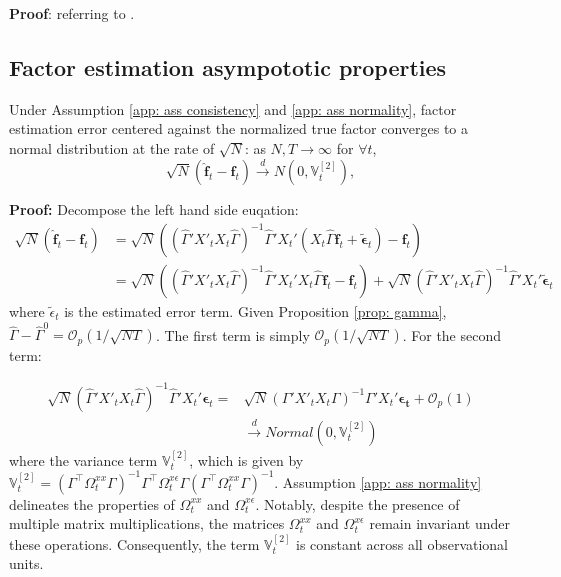 \documentclass[12pt]{article}
\begin{document}
\textbf{Proof}: referring to \cite{kelly2020instrumented}.
\subsection{Factor estimation asympototic properties}
\begin{proposition}
\label{prop: factor}
Under Assumption \ref{app: ass consistency} and \ref{app: ass normality}, factor estimation error centered against the normalized true factor converges to a normal distribution at the rate of $\sqrt{N}$: as $N, T \to \infty$ for $\forall t$,
$$
\sqrt{N}\left(\hat{\mathbf{f}}_t - \mathbf{f}_t\right) \xrightarrow{d} N\left(0, \mathbb{V}_t^{[2]}\right),
$$
\end{proposition}

\textbf{Proof:} Decompose the left hand side euqation:
\begin{equation*}
\begin{aligned}
\sqrt{N}\left(\mathbf{\hat{f}}_t - \mathbf{f}_t\right) &= \sqrt{N}\left(\left( \hat{\Gamma}'X'_tX_t\hat{\Gamma} \right)^{-1}\hat{\Gamma}'X_t' \left(X_t\hat{\Gamma}\mathbf{f}_t+ \mathbf{\tilde{\epsilon}}_t \right) - \mathbf{f}_t\right)\\
&= \sqrt{N}\left(\left( \hat{\Gamma}'X'_tX_t\hat{\Gamma} \right)^{-1}\hat{\Gamma}'X_t'X_t \hat{\Gamma}\mathbf{f}_t - \mathbf{f}_t\right) + \sqrt{N}\left( \hat{\Gamma}'X'_tX_t\hat{\Gamma} \right)^{-1}\hat{\Gamma}'X_t'\mathbf{\tilde{\epsilon}}_t
\end{aligned}
\end{equation*}
where $\tilde{\epsilon}_t$ is the estimated error term. Given Proposition \ref{prop: gamma}, $\hat{\Gamma} - \hat{\Gamma}^0 = \mathcal{O}_p \left( 1/\sqrt{NT} \right)$. The first term is simply $\mathcal{O}_p\left(1/\sqrt{NT}\right)$. For the second term:

\begin{equation*}
\begin{aligned}
\sqrt{N}\left( \hat{\Gamma}'X'_tX_t\hat{\Gamma} \right)^{-1}\hat{\Gamma}'X_t'\mathbf{\epsilon}_t = &\sqrt{N}\left( \Gamma'X'_tX_t\Gamma \right)^{-1}\Gamma'X_t'\mathbf{\epsilon_t} + \mathcal{O}_p(1) \\
& \xrightarrow{d} Normal(0, \mathbb{V}_t^{[2]})
\end{aligned}
\end{equation*}
where the variance term \(\mathbb{V}_{t}^{[2]}\), which is given by \(\mathbb{V}_{t}^{[2]} = \left( \Gamma^\top \Omega_{t}^{xx} \Gamma\right)^{-1} \Gamma^\top \Omega_{t}^{x\epsilon} \Gamma \left(\Gamma^\top\Omega_{t}^{xx} \Gamma\right)^{-1}\). Assumption \ref{app: ass normality} delineates the properties of \(\Omega_t^{xx}\) and \(\Omega_t^{x\epsilon}\). Notably, despite the presence of multiple matrix multiplications, the matrices \(\Omega_t^{xx}\) and \(\Omega_t^{x\epsilon}\) remain invariant under these operations. Consequently, the term \(\mathbb{V}_t^{[2]}\) is constant across all observational units.
\end{document}

